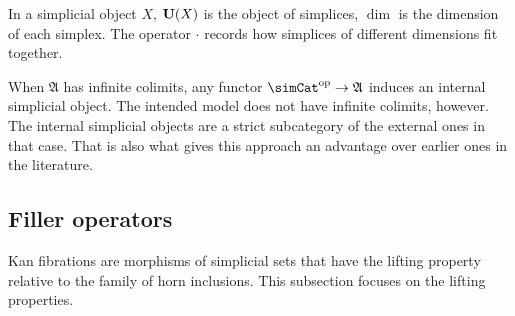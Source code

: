 \documentclass{tac}
\newcommand\hide[1]{}
\newcommand\dual{^{\mathrm{op}}}
\newcommand\s{^{\simCat\dual}}
\newcommand\ambient{\mathfrak A}
\begin{document}
In a simplicial object $X$, $\mathbf{U}\!\left(X\right)$ is the object of simplices, $\dim$ is the dimension of each simplex. The operator $\cdot$ records how simplices of different dimensions fit together. 

\begin{remark} When $\ambient$ has infinite colimits, any functor $\simCat\dual\to\ambient$ induces an internal simplicial object. The intended model does not have infinite colimits, however. The internal simplicial objects are a strict subcategory of the external ones in that case. That is also what gives this approach an advantage over earlier ones in the literature.%
\end{remark}

\hide{
\subsection{Families}
\begin{defin}
For each object $I$ of $\ambient$ the category $\ambient/I\s$ of simplicial objects in the slice $\ambient/I$ is an \emph{$I$-indexed families of simplicial objects}. 
\end{defin}

Is there anything to prove here?

Other thought: maybe treat the equivalence of $\ambient\s/J$ with $\ambient^{EJ}\s$ here, with $EJ$ the category of elements of the simplicial set $J$.

}

\subsection{Filler operators} %
Kan fibrations are morphisms of simplicial sets that have the lifting property relative to the family of horn inclusions. This subsection focuses on the lifting properties.

\hide{
When dealing with projectives, the properties 'there is a lifting' and having a lifting operator coincide.

We just need to be careful about non projective simplicial objects--these newbies may have unexpected properties.

Check when being projective plays a role.
}
\end{document}
